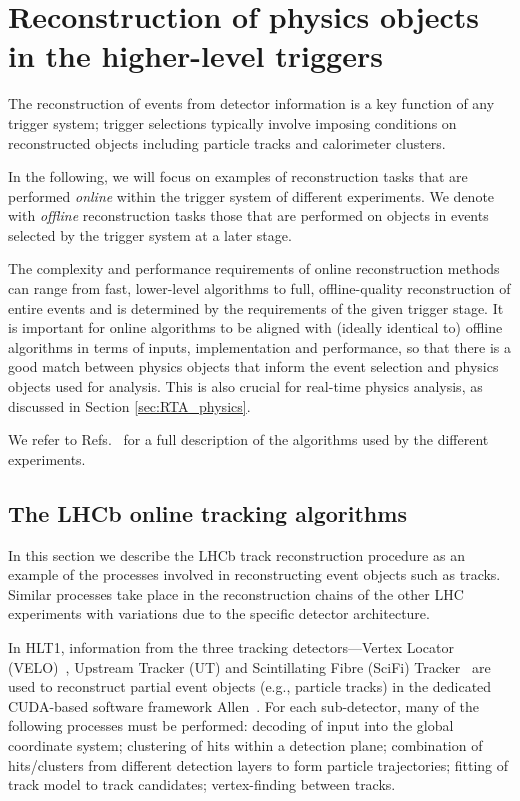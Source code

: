 \section{Reconstruction of physics objects in the higher-level triggers}

The reconstruction of events from detector information is a key function of any trigger system; trigger selections typically involve imposing conditions on reconstructed objects including particle tracks and calorimeter clusters. 

In the following, we will focus on examples of reconstruction tasks that are performed \textit{online} within the trigger system of different experiments. 
We denote with \textit{offline} reconstruction tasks those that are performed on objects in events selected by the trigger system at a later stage.  

The complexity and performance requirements of online reconstruction methods can range from fast, lower-level algorithms to full, offline-quality reconstruction of entire events and is determined by the requirements of the given trigger stage. 
It is important for online algorithms to be aligned with (ideally identical to) offline algorithms in terms of inputs, implementation and performance, so that there is a good match between physics objects that inform the event selection and physics objects used for analysis. 
This is also crucial for real-time physics analysis, as discussed in Section \ref{sec:RTA_physics}. 

We refer to Refs.~\cite{alice-upgrade, ATLASTriggerRun3, CMS:run3-detector, LHCb:upgrade_trigger_TDR} for a full description of the algorithms used by the different experiments.

\subsection{The LHCb online tracking algorithms}

In this section we describe the LHCb track reconstruction procedure as an example of the processes involved in reconstructing event objects such as tracks. Similar processes take place in the reconstruction chains of the other LHC experiments with variations due to the specific detector architecture.

In HLT1, information from the three tracking detectors—Vertex Locator (VELO)~\cite{LHCb:velo-tdr}, Upstream Tracker (UT) and Scintillating Fibre (SciFi) Tracker~\cite{LHCb:tracker-tdr} are used to reconstruct partial event objects (e.g., particle tracks) in the dedicated CUDA-based software framework Allen~\cite{LHCb_Allen_GPU}. 
For each sub-detector, many of the following processes must be performed: decoding of input into the global coordinate system; clustering of hits within a detection plane; combination of hits/clusters from different detection layers to form particle trajectories; fitting of track model to track candidates; vertex-finding between tracks.

